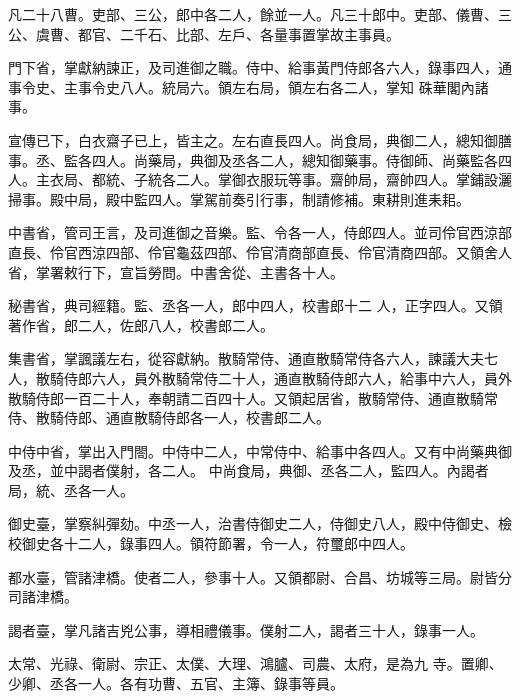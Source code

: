 \begin{pinyinscope}
 凡二十八曹。吏部、三公，郎中各二人，餘並一人。凡三十郎中。吏部、儀曹、三公、虞曹、都官、二千石、比部、左戶、各量事置掌故主事員。



 門下省，掌獻納諫正，及司進御之職。侍中、給事黃門侍郎各六人，錄事四人，通事令史、主事令史八人。統局六。領左右局，領左右各二人，掌知
 硃華閣內諸事。



 宣傳已下，白衣齋子已上，皆主之。左右直長四人。尚食局，典御二人，總知御膳事。丞、監各四人。尚藥局，典御及丞各二人，總知御藥事。侍御師、尚藥監各四人。主衣局、都統、子統各二人。掌御衣服玩等事。齋帥局，齋帥四人。掌鋪設灑掃事。殿中局，殿中監四人。掌駕前奏引行事，制請修補。東耕則進耒耜。



 中書省，管司王言，及司進御之音樂。監、令各一人，侍郎四人。並司伶官西涼部直長、伶官西涼四部、伶官龜茲四部、伶官清商部直長、伶官清商四部。又領舍人省，掌署敕行下，宣旨勞問。中書舍從、主書各十人。



 秘書省，典司經籍。監、丞各一人，郎中四人，校書郎十二
 人，正字四人。又領著作省，郎二人，佐郎八人，校書郎二人。



 集書省，掌諷議左右，從容獻納。散騎常侍、通直散騎常侍各六人，諫議大夫七人，散騎侍郎六人，員外散騎常侍二十人，通直散騎侍郎六人，給事中六人，員外散騎侍郎一百二十人，奉朝請二百四十人。又領起居省，散騎常侍、通直散騎常侍、散騎侍郎、通直散騎侍郎各一人，校書郎二人。



 中侍中省，掌出入門閤。中侍中二人，中常侍中、給事中各四人。又有中尚藥典御及丞，並中謁者僕射，各二人。
 中尚食局，典御、丞各二人，監四人。內謁者局，統、丞各一人。



 御史臺，掌察糾彈劾。中丞一人，治書侍御史二人，侍御史八人，殿中侍御史、檢校御史各十二人，錄事四人。領符節署，令一人，符璽郎中四人。



 都水臺，管諸津橋。使者二人，參事十人。又領都尉、合昌、坊城等三局。尉皆分司諸津橋。



 謁者臺，掌凡諸吉兇公事，導相禮儀事。僕射二人，謁者三十人，錄事一人。



 太常、光祿、衛尉、宗正、太僕、大理、鴻臚、司農、太府，是為九
 寺。置卿、少卿、丞各一人。各有功曹、五官、主簿、錄事等員。




\end{pinyinscope}
